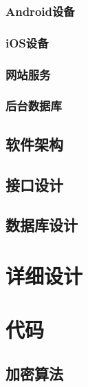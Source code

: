 \documentclass[UTF8]{ctexart}
\begin{document}
    \subsubsection{Android设备}
    \subsubsection{iOS设备}
    \subsubsection{网站服务}
    \subsubsection{后台数据库}
    
    \subsection{软件架构}
    \subsection{接口设计}
    \subsection{数据库设计}
    
    \section{详细设计}
    \section{代码}
    \subsection{加密算法}
\end{document}
